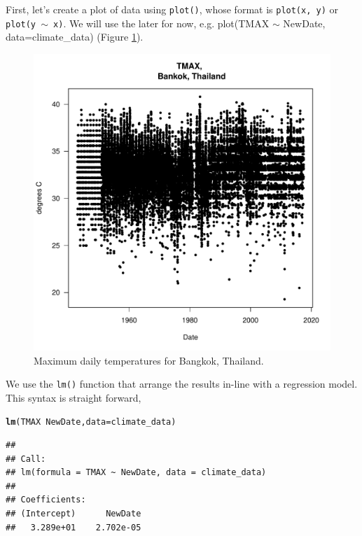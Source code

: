 \documentclass{article}\usepackage[]{graphicx}\usepackage[]{color}
\makeatletter
\def\maxwidth{ %
  \ifdim\Gin@nat@width>\linewidth
    \linewidth
  \else
    \Gin@nat@width
  \fi
}
\newcommand{\hlopt}[1]{\textcolor[rgb]{0,0,0}{#1}}%
\newcommand{\hlstd}[1]{\textcolor[rgb]{0.345,0.345,0.345}{#1}}%
\newcommand{\hlkwc}[1]{\textcolor[rgb]{0.333,0.667,0.333}{#1}}%
\newcommand{\hlkwd}[1]{\textcolor[rgb]{0.737,0.353,0.396}{\textbf{#1}}}%
\newenvironment{kframe}{%
 \def\at@end@of@kframe{}%
 \ifinner\ifhmode%
  \def\at@end@of@kframe{\end{minipage}}%
  \begin{minipage}{\columnwidth}%
 \fi\fi%
 \def\FrameCommand##1{\hskip\@totalleftmargin \hskip-\fboxsep
 \colorbox{shadecolor}{##1}\hskip-\fboxsep
     \hskip-\linewidth \hskip-\@totalleftmargin \hskip\columnwidth}%
 \MakeFramed {\advance\hsize-\width
   \@totalleftmargin\z@ \linewidth\hsize
   \@setminipage}}%
 {\par\unskip\endMakeFramed%
 \at@end@of@kframe}
\newenvironment{knitrout}{}{} %
\makeatother
\begin{document}
First, let's create a plot of data using \texttt{plot()}, whose format is \texttt{plot(x, y)} or \texttt{plot(y $\sim$ x)}. We will use the later for now, e.g. plot(TMAX $\sim$ NewDate, data=climate\_data) (Figure \ref{fig:test12}).

\begin{figure}
\caption{Maximum daily temperatures for Bangkok, Thailand.}
\label{fig:test12}
\begin{knitrout}
\color{fgcolor}
\includegraphics[width=\maxwidth]{figure/Tmaxplot-1} 

\end{knitrout}
\end{figure}

We use the \texttt{lm()} function that arrange the results in-line with a regression model. This syntax is straight forward,  

\begin{knitrout}
\color{fgcolor}\begin{kframe}
\begin{alltt}
\hlkwd{lm}\hlstd{(TMAX} \hlopt{~} \hlstd{NewDate,} \hlkwc{data}\hlstd{=climate_data)}
\end{alltt}
\begin{verbatim}
## 
## Call:
## lm(formula = TMAX ~ NewDate, data = climate_data)
## 
## Coefficients:
## (Intercept)      NewDate  
##   3.289e+01    2.702e-05
\end{verbatim}
\end{kframe}
\end{knitrout}
\end{document}
